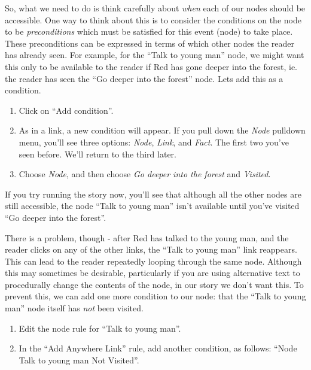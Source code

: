 \documentclass{article}
\begin{document}
So, what we need to do is think carefully about \textit{when} each of our nodes
should be accessible. One way to think about this is to consider the conditions
on the node to be \textit{preconditions} which must be satisfied for this event
(node) to take place. These preconditions can be expressed in terms of which
other nodes the reader has already seen. For example, for the ``Talk to young
man'' node, we might want this only to be available to the reader if Red has
gone deeper into the forest, ie. the reader has seen the ``Go deeper into the
forest'' node. Lets add this as a condition.

\begin{enumerate}
  \item Click on ``Add condition''.
  \item As in a link, a new condition will appear. If you pull down the
  \textit{Node} pulldown menu, you'll see three options: \textit{Node},
  \textit{Link}, and \textit{Fact}. The first two you've seen before. We'll
  return to the third later.
  \item Choose \textit{Node}, and then choose \textit{Go deeper into the
  forest} and \textit{Visited}.
\end{enumerate}

If you try running the story now, you'll see that although all the other nodes
are still accessible, the node ``Talk to young man'' isn't available until
you've visited ``Go deeper into the forest''.

There is a problem, though - after Red has talked to the young man, and the
reader clicks on any of the other links, the ``Talk to young man'' link
reappears. This can lead to the reader repeatedly looping through the same
node. Although this may sometimes be desirable, particularly if you are using
alternative text to procedurally change the contents of the node, in our story
we don't want this. To prevent this, we can add one more condition to our node:
that the ``Talk to young man'' node itself has \textit{not} been visited.

\begin{enumerate}
  \item Edit the node rule for ``Talk to young man''.
  \item In the ``Add Anywhere Link'' rule, add another condition, as follows:
  ``Node Talk to young man Not Visited''.
\end{enumerate}
\end{document}
